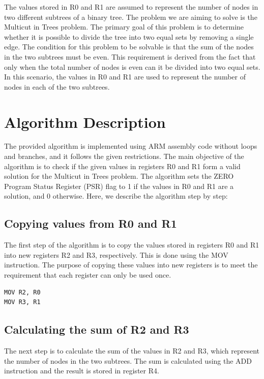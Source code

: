 The values stored in R0 and R1 are assumed to represent the number of nodes in two different subtrees of a binary tree. The problem we are aiming to solve is the Multicut in Trees problem. The primary goal of this problem is to determine whether it is possible to divide the tree into two equal sets by removing a single edge. The condition for this problem to be solvable is that the sum of the nodes in the two subtrees must be even. This requirement is derived from the fact that only when the total number of nodes is even can it be divided into two equal sets. In this scenario, the values in R0 and R1 are used to represent the number of nodes in each of the two subtrees.

\section{Algorithm Description}

The provided algorithm is implemented using ARM assembly code without loops and branches, and it follows the given restrictions. The main objective of the algorithm is to check if the given values in registers R0 and R1 form a valid solution for the Multicut in Trees problem. The algorithm sets the ZERO Program Status Register (PSR) flag to 1 if the values in R0 and R1 are a solution, and 0 otherwise. Here, we describe the algorithm step by step:

\subsection{Copying values from R0 and R1}

The first step of the algorithm is to copy the values stored in registers R0 and R1 into new registers R2 and R3, respectively. This is done using the MOV instruction. The purpose of copying these values into new registers is to meet the requirement that each register can only be used once.

\begin{verbatim}
MOV R2, R0
MOV R3, R1
\end{verbatim}

\subsection{Calculating the sum of R2 and R3}

The next step is to calculate the sum of the values in R2 and R3, which represent the number of nodes in the two subtrees. The sum is calculated using the ADD instruction and the result is stored in register R4.

